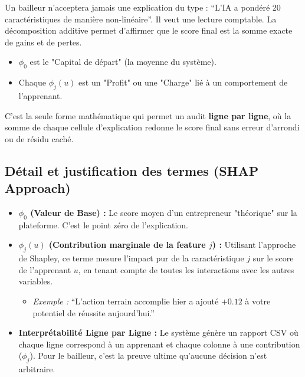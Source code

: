 \documentclass[11pt,a4paper]{article}
\begin{document}
Un bailleur n'acceptera jamais une explication du type : ``L'IA a pondéré 20 caractéristiques de manière non-linéaire''. Il veut une lecture comptable. La décomposition additive permet d'affirmer que le score final est la somme exacte de gains et de pertes. 
\begin{itemize}
    \item \textbf{$\phi_0$} est le "Capital de départ" (la moyenne du système).
    \item Chaque \textbf{$\phi_j(u)$} est un "Profit" ou une "Charge" lié à un comportement de l'apprenant.
\end{itemize}
C'est la seule forme mathématique qui permet un audit \textbf{ligne par ligne}, où la somme de chaque cellule d'explication redonne le score final sans erreur d'arrondi ou de résidu caché.

\subsection{Détail et justification des termes (SHAP Approach)}
\begin{itemize}
    \item \textbf{$\phi_0$ (Valeur de Base) :} Le score moyen d'un entrepreneur "théorique" sur la plateforme. C'est le point zéro de l'explication.
    
    \item \textbf{$\phi_j(u)$ (Contribution marginale de la feature $j$) :} 
    Utilisant l'approche de Shapley, ce terme mesure l'impact pur de la caractéristique $j$ sur le score de l'apprenant $u$, en tenant compte de toutes les interactions avec les autres variables.
    \begin{itemize}
        \item \textit{Exemple :} ``L'action terrain accomplie hier a ajouté $+0.12$ à votre potentiel de réussite aujourd'hui.''
    \end{itemize}

    \item \textbf{Interprétabilité Ligne par Ligne :} Le système génère un rapport CSV où chaque ligne correspond à un apprenant et chaque colonne à une contribution ($\phi_j$). Pour le bailleur, c'est la preuve ultime qu'aucune décision n'est arbitraire.
\end{itemize}
\end{document}
